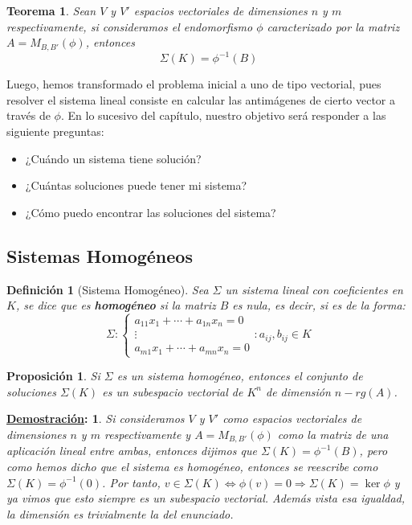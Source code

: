 \documentclass[10pt,a4paper,openright]{book}
\theoremstyle{break}
\newtheorem*{defi}{Definición}
\newtheorem*{theo}{Teorema}
\newtheorem*{prop}{Proposición}
\newtheorem*{demo}{\underline{Demostración}:}
\begin{document}
\begin{theo}
Sean $V$ y $V'$ espacios vectoriales de dimensiones $n$ y $m$ respectivamente, si consideramos el endomorfismo $\phi$ caracterizado por la matriz $A = M_{B,B'}(\phi)$, entonces
$$\Sigma(K) = \phi^{-1}(B)$$
\end{theo}

Luego, hemos transformado el problema inicial a uno de tipo vectorial, pues resolver el sistema lineal consiste en calcular las antimágenes de cierto vector a través de $\phi$. En lo sucesivo del capítulo, nuestro objetivo será responder a las siguiente preguntas:
\begin{itemize}
\item ¿Cuándo un sistema tiene solución?
\item ¿Cuántas soluciones puede tener mi sistema?
\item ¿Cómo puedo encontrar las soluciones del sistema?
\end{itemize}

\subsection{Sistemas Homogéneos}
\begin{defi}[Sistema Homogéneo]
Sea $\Sigma$ un sistema lineal con coeficientes en $K$, se dice que es \textbf{homogéneo} si la matriz $B$ es nula, es decir, si es de la forma:
$$\Sigma: \begin{cases}a_{11} x_1+\cdots+a_{1n}x_n=0 \\ \vdots \\ a_{m1}x_1+\cdots+a_{mn}x_n=0\end{cases}: a_{ij}, b_{ij}\in K$$
\end{defi}
\begin{prop}
Si $\Sigma$ es un sistema homogéneo, entonces el conjunto de soluciones $\Sigma(K)$ es un subespacio vectorial de $K^n$ de dimensión $n-rg(A)$. 
\end{prop}
\begin{demo}
Si consideramos $V$ y $V'$ como espacios vectoriales de dimensiones $n$ y $m$ respectivamente y $A = M_{B,B'}(\phi)$ como la matriz de una aplicación lineal entre ambas, entonces dijimos que $\Sigma(K) = \phi^{-1}(B)$, pero como hemos dicho que el sistema es homogéneo, entonces se reescribe como $\Sigma(K) = \phi^{-1}(0)$. Por tanto, $v\in \Sigma(K) \Leftrightarrow \phi(v) = 0\Rightarrow \Sigma(K) = \ker \phi$ y ya vimos que esto siempre es un subespacio vectorial. Además vista esa igualdad, la dimensión es trivialmente la del enunciado.
\end{demo}
\end{document}
